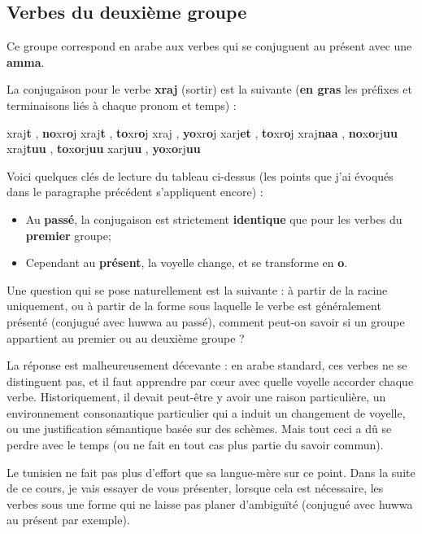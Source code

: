 \subsection{Verbes du deuxième groupe}
Ce groupe correspond en arabe aux verbes qui se conjuguent au présent avec une \textbf{\dh amma}.

La conjugaison pour le verbe \textbf{xraj} (sortir) est la suivante (\textbf{en gras} les préfixes et terminaisons liés à chaque pronom et temps) :

    {xraj\textbf{t} , \textbf{no}xr\textbf{o}j} 
    {xraj\textbf{t} , \textbf{to}xr\textbf{o}j}
    {xraj , \textbf{yo}xr\textbf{o}j} 
    {xarj\textbf{et} , \textbf{to}xr\textbf{o}j} 
    {xraj\textbf{naa} , \textbf{no}x\textbf{o}rj\textbf{uu}} 
    {xraj\textbf{tuu} , \textbf{to}x\textbf{o}rj\textbf{uu}} 
    {xarj\textbf{uu} , \textbf{yo}x\textbf{o}rj\textbf{uu}} 

Voici quelques clés de lecture du tableau ci-dessus (les points que j'ai évoqués dans le paragraphe précédent s'appliquent encore) :

\begin{itemize}
    \item Au \textbf{passé}, la conjugaison est strictement \textbf{identique} que pour les verbes du \textbf{premier} groupe;
    \item Cependant au \textbf{présent}, la voyelle change, et se transforme en \textbf{o}. 
\end{itemize}

Une question qui se pose naturellement est la suivante : à partir de la racine uniquement, ou à partir de la forme sous laquelle le verbe est généralement présenté (conjugué avec huwwa au passé), comment peut-on savoir si un groupe appartient au premier ou au deuxième groupe ? 

La réponse est malheureusement décevante : en arabe standard, ces verbes ne se distinguent pas, et il faut apprendre par c\oe ur avec quelle voyelle accorder chaque verbe. Historiquement, il devait peut-être y avoir une raison particulière, un environnement consonantique particulier qui a induit un changement de voyelle, ou une justification sémantique basée sur des schèmes. Mais tout ceci a dû se perdre avec le temps (ou ne fait en tout cas plus partie du savoir commun).

Le tunisien ne fait pas plus d'effort que sa langue-mère sur ce point. Dans la suite de ce cours, je vais essayer de vous présenter, lorsque cela est nécessaire, les verbes sous une forme qui ne laisse pas planer d'ambiguïté (conjugué avec huwwa au présent par exemple).

